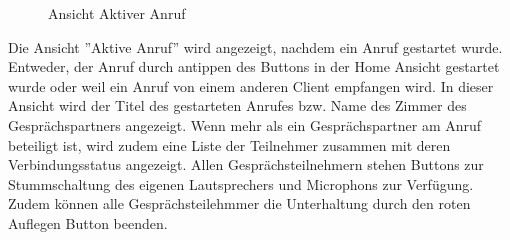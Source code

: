 \begin{figure}[h]
\begin{minipage}[b]{0.45\textwidth}
        \caption{Ansicht Aktiver Anruf}
    \end{minipage}
    \label{fig:MobileClient-Screens3}
\end{figure}

Die Ansicht ''Aktive Anruf'' wird angezeigt, nachdem ein Anruf gestartet wurde.
Entweder, der Anruf durch antippen des Buttons in der Home Ansicht gestartet wurde oder weil ein Anruf von einem anderen Client empfangen wird.
In dieser Ansicht wird der Titel des gestarteten Anrufes bzw. Name des Zimmer des Gesprächspartners angezeigt.
Wenn mehr als ein Gesprächspartner am Anruf beteiligt ist, wird zudem eine Liste der Teilnehmer zusammen mit deren Verbindungsstatus angezeigt.
Allen Gesprächsteilnehmern stehen Buttons zur Stummschaltung des eigenen Lautsprechers und Microphons zur Verfügung.
Zudem können alle Gesprächsteilehmmer die Unterhaltung durch den roten Auflegen Button beenden.


